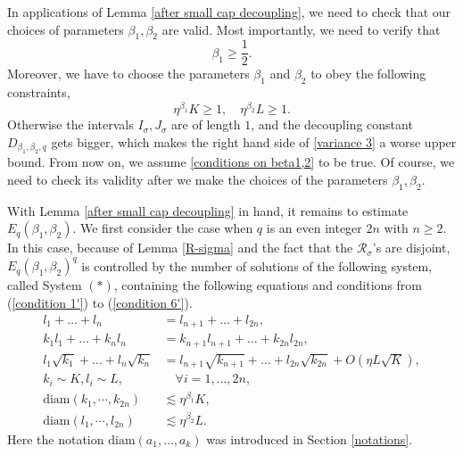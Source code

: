 \documentclass[11pt]{amsart}
\numberwithin{equation}{section}
\theoremstyle{definition}
\theoremstyle{proposition}
\begin{document}
In applications of Lemma \ref{after small cap decoupling}, we need to check that our choices of parameters $\beta_1,\beta_2$ are valid. Most importantly, we need to verify that
\begin{equation}   \label{beta1 da yu 1/2}
 \beta_1 \ge \frac{1}{2}.    
\end{equation}
Moreover, we have to choose the parameters $\beta_1$ and $\beta_2$ to obey the following constraints,  
\begin{equation}  \label{conditions on beta1,2}
\eta^{\beta_1}K\ge 1, \quad  \eta^{\beta_2}L\ge 1.   
\end{equation}
Otherwise the intervals $I_\sigma,J_\sigma$ are of length $1$,  %
and the decoupling constant $D_{\beta_1,\beta_2,q}$ gets bigger, which makes the right hand side of \eqref{variance 3} a worse upper bound. From now on, we assume \eqref{conditions on beta1,2} to be true. Of course, we need to check its validity after we make the choices of the parameters $\beta_1,\beta_2$. 

With Lemma \ref{after small cap decoupling} in hand,  it remains to  estimate $E_q(\beta_1,\beta_2)$. We first consider the case when $q$ is an even integer $2n$ with $n\geq 2$. In this case,   because of Lemma \ref{R-sigma} and the fact that the $\mathcal R_\sigma$'s are disjoint, $E_q(\beta_1,\beta_2)^q$ is controlled by  the number of solutions of the following system, called System $(*)$,  containing the following equations and conditions 
from (\ref{condition 1'}) to (\ref{condition 6'}).
\begin{align}
l_1+\dots +l_n &=l_{n+1}+\dots +l_{2n},     \label{condition 1'} 
\\  k_1l_1+\dots +k_n l_n &=k_{n+1}l_{n+1}+\dots +k_{2n} l_{2n}, \label{condition 2'}
\\ l_1\sqrt{k_1} +\dots + l_n\sqrt{k_n}&=l_{n+1}\sqrt{k_{n+1}}+\dots + l_{2n}\sqrt{k_{2n}}+O(\eta L\sqrt{K}),   \label{condition 3'}
\\ k_i \sim K, l_i\sim L, & \quad \forall i=1,...,2n,   \label{condition 4'}
\\ \text{diam}(k_1,\cdots,k_{2n})&\lesssim \eta^{\beta_1}K ,  \label{condition 5'}
\\ \text{diam}(l_1,\cdots,l_{2n})&\lesssim \eta^{\beta_2}L . \label{condition 6'}
\end{align}
Here the notation $\text{diam}(a_1,\dots,a_k)$ was introduced in Section \ref{notations}.  \\
\end{document}
